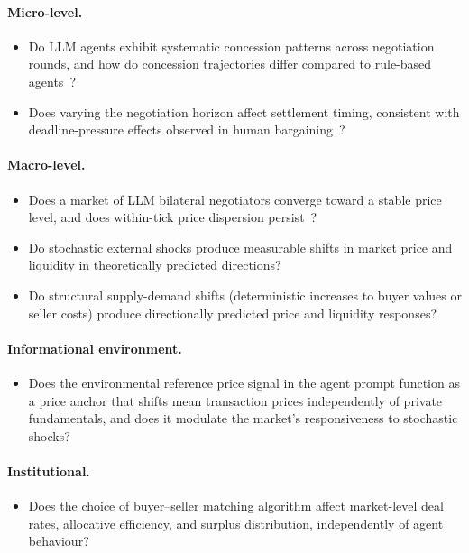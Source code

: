 \paragraph{Micro-level.}
\begin{itemize}
    \item[\textbf{RQ-1.}] Do LLM agents exhibit systematic concession patterns across negotiation rounds, and how do concession trajectories differ compared to rule-based agents~\cite{rubinstein1982}?
    \item[\textbf{RQ-2.}] Does varying the negotiation horizon affect settlement timing, consistent with deadline-pressure effects observed in human bargaining~\cite{roth1988deadline}?
\end{itemize}

\paragraph{Macro-level.}
\begin{itemize}
    \item[\textbf{RQ-3.}] Does a market of LLM bilateral negotiators converge toward a stable price level, and does within-tick price dispersion persist~\cite{rubinstein1985}?
    \item[\textbf{RQ-4.}] Do stochastic external shocks produce measurable shifts in market price and liquidity in theoretically predicted directions?
    \item[\textbf{RQ-6.}] Do structural supply-demand shifts (deterministic increases to buyer values or seller costs) produce directionally predicted price and liquidity responses?
\end{itemize}

\paragraph{Informational environment.}
\begin{itemize}
    \item[\textbf{RQ-4ext.}] Does the environmental reference price signal in the agent prompt function as a price anchor that shifts mean transaction prices independently of private fundamentals, and does it modulate the market's responsiveness to stochastic shocks?
\end{itemize}

\paragraph{Institutional.}
\begin{itemize}
    \item[\textbf{RQ-5.}] Does the choice of buyer--seller matching algorithm affect market-level deal rates, allocative efficiency, and surplus distribution, independently of agent behaviour?
\end{itemize}

